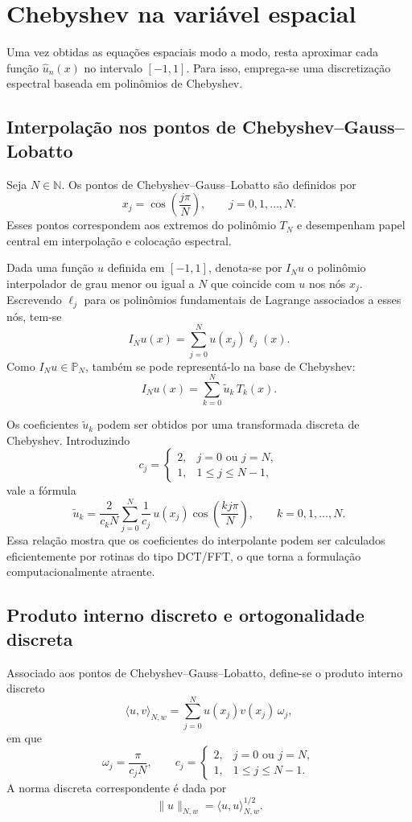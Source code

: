 \section{Chebyshev na variável espacial}

Uma vez obtidas as equações espaciais modo a modo, resta aproximar cada função \(\widehat{u}_n(x)\) no intervalo \([-1,1]\). Para isso, emprega-se uma discretização espectral baseada em polinômios de Chebyshev.

\subsection{Interpolação nos pontos de Chebyshev--Gauss--Lobatto}

Seja \(N\in\mathbb{N}\). Os pontos de Chebyshev--Gauss--Lobatto são definidos por
\[
x_j=\cos\left(\frac{j\pi}{N}\right), \qquad j=0,1,\dots,N.
\]
Esses pontos correspondem aos extremos do polinômio \(T_N\) e desempenham papel central em interpolação e colocação espectral.

Dada uma função \(u\) definida em \([-1,1]\), denota-se por \(I_Nu\) o polinômio interpolador de grau menor ou igual a \(N\) que coincide com \(u\) nos nós \(x_j\). Escrevendo \(\ell_j\) para os polinômios fundamentais de Lagrange associados a esses nós, tem-se
\[
I_Nu(x)=\sum_{j=0}^{N}u(x_j)\ell_j(x).
\]
Como \(I_Nu\in \mathbb{P}_N\), também se pode representá-lo na base de Chebyshev:
\[
I_Nu(x)=\sum_{k=0}^{N}\widetilde{u}_k\,T_k(x).
\]

Os coeficientes \(\widetilde{u}_k\) podem ser obtidos por uma transformada discreta de Chebyshev. Introduzindo
\[
c_j=
\begin{cases}
2, & j=0 \text{ ou } j=N,\\
1, & 1\leq j\leq N-1,
\end{cases}
\]
vale a fórmula
\[
\widetilde{u}_k=\frac{2}{c_k N}\sum_{j=0}^{N}\frac{1}{c_j}\,u(x_j)\cos\left(\frac{kj\pi}{N}\right),
\qquad k=0,1,\dots,N.
\]
Essa relação mostra que os coeficientes do interpolante podem ser calculados eficientemente por rotinas do tipo DCT/FFT, o que torna a formulação computacionalmente atraente.

\subsection{Produto interno discreto e ortogonalidade discreta}

Associado aos pontos de Chebyshev--Gauss--Lobatto, define-se o produto interno discreto
\[
\langle u,v\rangle_{N,w}
=
\sum_{j=0}^{N}u(x_j)v(x_j)\,\omega_j,
\]
em que
\[
\omega_j=\frac{\pi}{c_jN},
\qquad
c_j=
\begin{cases}
2, & j=0 \text{ ou } j=N,\\
1, & 1\leq j\leq N-1.
\end{cases}
\]
A norma discreta correspondente é dada por
\[
\|u\|_{N,w}=\langle u,u\rangle_{N,w}^{1/2}.
\]

